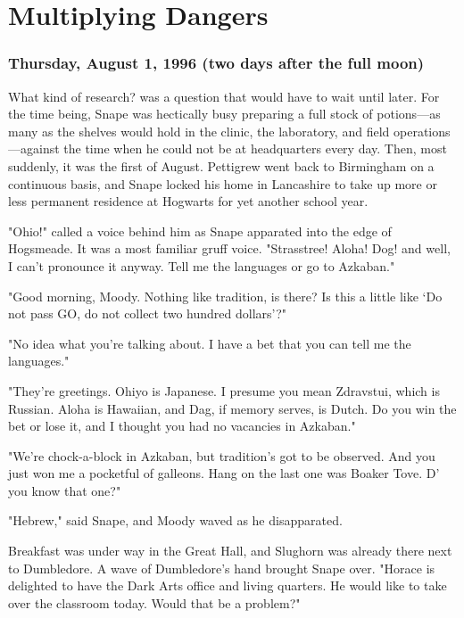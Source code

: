 
\chapter{Multiplying Dangers}

\subsection{Thursday, August 1, 1996 (two days after the full moon)}

What kind of research? was a question that would have to wait until later. For the time being, Snape was hectically busy preparing a full stock of potions—as many as the shelves would hold in the clinic, the laboratory, and field operations—against the time when he could not be at headquarters every day. Then, most suddenly, it was the first of August. Pettigrew went back to Birmingham on a continuous basis, and Snape locked his home in Lancashire to take up more or less permanent residence at Hogwarts for yet another school year.

"Ohio!" called a voice behind him as Snape apparated into the edge of Hogsmeade. It was a most familiar gruff voice. "Strasstree! Aloha! Dog! and{\el} well, I can't pronounce it anyway. Tell me the languages or go to Azkaban."

"Good morning, Moody. Nothing like tradition, is there? Is this a little like `Do not pass GO, do not collect two hundred dollars'?"

"No idea what you're talking about. I have a bet that you can tell me the languages."

"They're greetings. Ohiyo is Japanese. I presume you mean Zdravstui, which is Russian. Aloha is Hawaiian, and Dag, if memory serves, is Dutch. Do you win the bet or lose it, and I thought you had no vacancies in Azkaban."

"We're chock-a-block in Azkaban, but tradition's got to be observed. And you just won me a pocketful of galleons. Hang on{\el} the last one was Boaker Tove. D' you know that one?"

"Hebrew," said Snape, and Moody waved as he disapparated.

Breakfast was under way in the Great Hall, and Slughorn was already there next to Dumbledore. A wave of Dumbledore's hand brought Snape over. "Horace is delighted to have the Dark Arts office and living quarters. He would like to take over the classroom today. Would that be a problem?"

